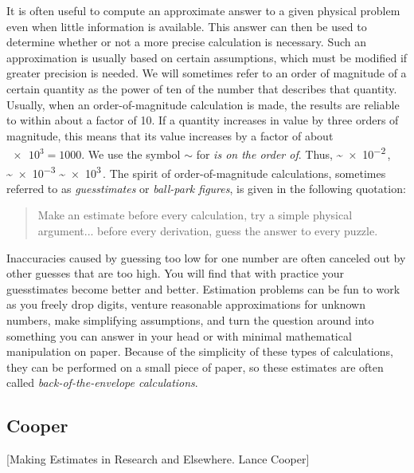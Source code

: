 It is often useful to compute an approximate answer to a given physical problem even when little information is available. This answer can then be used to determine whether or not a more precise calculation is necessary. Such an approximation is usually based on certain assumptions, which must be modified if greater precision is needed. We will sometimes refer to an order of magnitude of a certain quantity as the power of ten of the number that describes that quantity. Usually, when an order-of-magnitude calculation is made, the results are reliable to within about a factor of 10. If a quantity increases in value by three orders of magnitude, this means that its value increases by a factor of about $\num{e3}= 1 000$. We use the symbol $\sim$ for \emph{is on the order of}. Thus,
 \sim \num{e-2}\,, \sim \num{e-3}\qquad{} \sim \num{e3}\,.
\eeq
The spirit of order-of-magnitude calculations, sometimes referred to as \emph{guesstimates} or \emph{ball-park figures}, is given in the following quotation: 
%
\begin{quote}
Make an estimate before every calculation, try a simple physical argument... before every derivation, guess the answer to every puzzle.
\end{quote}
%
Inaccuracies caused by guessing too low for one number are often canceled out by other guesses that are too high. You will find that with practice your guesstimates become better and better. Estimation problems can be fun to work as you freely drop digits, venture reasonable approximations for unknown numbers, make simplifying assumptions, and turn the question around into something you can answer in your head or with minimal mathematical manipulation on paper. Because of the simplicity of these types of calculations, they can be performed on a small piece of paper, so these estimates are often called \emph{back-of-the-envelope calculations}.


\subsection{Cooper}
[Making Estimates in Research and Elsewhere. Lance Cooper]

